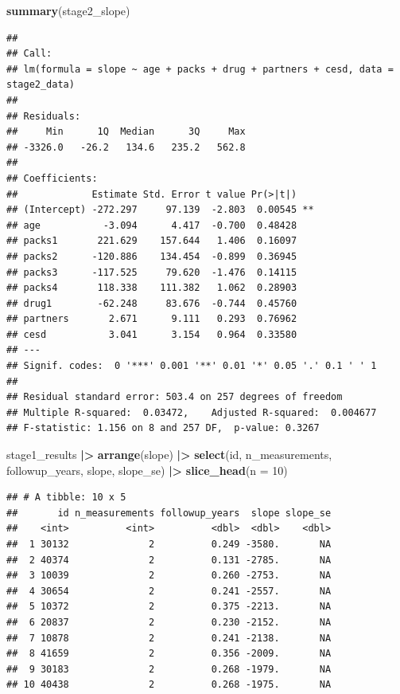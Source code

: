 \documentclass[
]{article}
\newenvironment{Shaded}{\begin{snugshade}}{\end{snugshade}}
\newcommand{\AttributeTok}[1]{\textcolor[rgb]{0.13,0.29,0.53}{#1}}
\newcommand{\DecValTok}[1]{\textcolor[rgb]{0.00,0.00,0.81}{#1}}
\newcommand{\FunctionTok}[1]{\textcolor[rgb]{0.13,0.29,0.53}{\textbf{#1}}}
\newcommand{\NormalTok}[1]{#1}
\newcommand{\SpecialCharTok}[1]{\textcolor[rgb]{0.81,0.36,0.00}{\textbf{#1}}}
\begin{document}
\begin{Shaded}
\begin{Highlighting}[]
\FunctionTok{summary}\NormalTok{(stage2\_slope)}
\end{Highlighting}
\end{Shaded}

\begin{verbatim}
## 
## Call:
## lm(formula = slope ~ age + packs + drug + partners + cesd, data = stage2_data)
## 
## Residuals:
##     Min      1Q  Median      3Q     Max 
## -3326.0   -26.2   134.6   235.2   562.8 
## 
## Coefficients:
##             Estimate Std. Error t value Pr(>|t|)   
## (Intercept) -272.297     97.139  -2.803  0.00545 **
## age           -3.094      4.417  -0.700  0.48428   
## packs1       221.629    157.644   1.406  0.16097   
## packs2      -120.886    134.454  -0.899  0.36945   
## packs3      -117.525     79.620  -1.476  0.14115   
## packs4       118.338    111.382   1.062  0.28903   
## drug1        -62.248     83.676  -0.744  0.45760   
## partners       2.671      9.111   0.293  0.76962   
## cesd           3.041      3.154   0.964  0.33580   
## ---
## Signif. codes:  0 '***' 0.001 '**' 0.01 '*' 0.05 '.' 0.1 ' ' 1
## 
## Residual standard error: 503.4 on 257 degrees of freedom
## Multiple R-squared:  0.03472,    Adjusted R-squared:  0.004677 
## F-statistic: 1.156 on 8 and 257 DF,  p-value: 0.3267
\end{verbatim}

\begin{Shaded}
\begin{Highlighting}[]
\NormalTok{stage1\_results }\SpecialCharTok{|\textgreater{}}
  \FunctionTok{arrange}\NormalTok{(slope) }\SpecialCharTok{|\textgreater{}}
  \FunctionTok{select}\NormalTok{(id, n\_measurements, followup\_years, slope, slope\_se) }\SpecialCharTok{|\textgreater{}}
  \FunctionTok{slice\_head}\NormalTok{(}\AttributeTok{n =} \DecValTok{10}\NormalTok{)}
\end{Highlighting}
\end{Shaded}

\begin{verbatim}
## # A tibble: 10 x 5
##       id n_measurements followup_years  slope slope_se
##    <int>          <int>          <dbl>  <dbl>    <dbl>
##  1 30132              2          0.249 -3580.       NA
##  2 40374              2          0.131 -2785.       NA
##  3 10039              2          0.260 -2753.       NA
##  4 30654              2          0.241 -2557.       NA
##  5 10372              2          0.375 -2213.       NA
##  6 20837              2          0.230 -2152.       NA
##  7 10878              2          0.241 -2138.       NA
##  8 41659              2          0.356 -2009.       NA
##  9 30183              2          0.268 -1979.       NA
## 10 40438              2          0.268 -1975.       NA
\end{verbatim}
\end{document}
